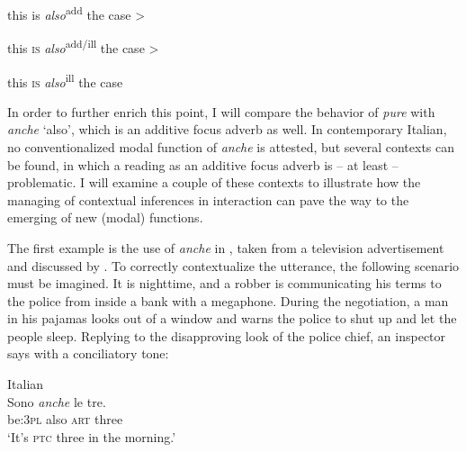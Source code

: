           this is \textit{also}\textsuperscript{add} the case >

this \textsc{is} \textit{also}\textsuperscript{add/ill} the case >

this \textsc{is} \textit{also}\textsuperscript{ill} the case
    \z

In order to further enrich this point, I will compare the behavior of \textit{pure} with \textit{anche} ‘also’, which is an additive focus adverb as well. In contemporary Italian, no conventionalized modal function of \textit{anche} is attested, but several contexts can be found, in which a reading as an additive focus adverb is – at least – problematic. I will examine a couple of these contexts to illustrate how the managing of contextual inferences in interaction can pave the way to the emerging of new (modal) functions.

The first example is the use of \textit{anche} in , taken from a television advertisement and discussed by \citet[185–186]{Andorno2003}. To correctly contextualize the utterance, the following scenario must be imagined. It is nighttime, and a robber is communicating his terms to the police from inside a bank with a megaphone. During the negotiation, a man in his pajamas looks out of a window and warns the police to shut up and let the people sleep. Replying to the disapproving look of the police chief, an inspector says with a conciliatory tone:

\ea%
\label{ex:key:49}
Italian \citep[186]{Andorno2003}\\
\gll Sono      \textit{anche}  le              tre.\\
be:3\textsc{pl} also \textsc{art} three\\
\glt ‘It’s \textsc{ptc} three in the morning.’
\z

